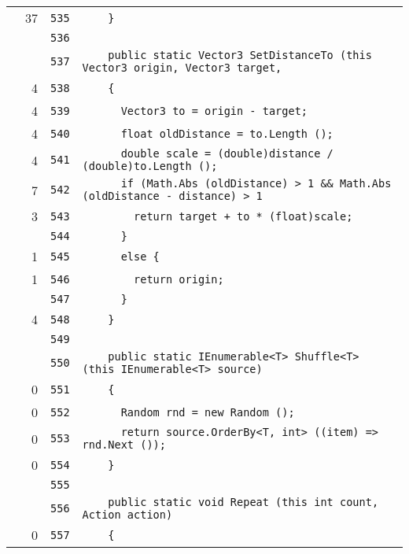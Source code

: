 \documentclass[a4paper,10pt]{article}
\begin{document}
\begin{longtable}[l]{lrrl}
\cellcolor{green} & 37 & \verb~535~ & \verb~    }~\\
\cellcolor{gray} &  & \verb~536~ & \verb~~\\
\cellcolor{gray} &  & \verb~537~ & \verb~    public static Vector3 SetDistanceTo (this Vector3 origin, Vector3 target, ~\\
\cellcolor{green} & 4 & \verb~538~ & \verb~    {~\\
\cellcolor{green} & 4 & \verb~539~ & \verb~      Vector3 to = origin - target;~\\
\cellcolor{green} & 4 & \verb~540~ & \verb~      float oldDistance = to.Length ();~\\
\cellcolor{green} & 4 & \verb~541~ & \verb~      double scale = (double)distance / (double)to.Length ();~\\
\cellcolor{green} & 7 & \verb~542~ & \verb~      if (Math.Abs (oldDistance) > 1 && Math.Abs (oldDistance - distance) > 1 ~\\
\cellcolor{green} & 3 & \verb~543~ & \verb~        return target + to * (float)scale;~\\
\cellcolor{gray} &  & \verb~544~ & \verb~      }~\\
\cellcolor{green} & 1 & \verb~545~ & \verb~      else {~\\
\cellcolor{green} & 1 & \verb~546~ & \verb~        return origin;~\\
\cellcolor{gray} &  & \verb~547~ & \verb~      }~\\
\cellcolor{green} & 4 & \verb~548~ & \verb~    }~\\
\cellcolor{gray} &  & \verb~549~ & \verb~~\\
\cellcolor{gray} &  & \verb~550~ & \verb~    public static IEnumerable<T> Shuffle<T> (this IEnumerable<T> source)~\\
\cellcolor{red} & 0 & \verb~551~ & \verb~    {~\\
\cellcolor{red} & 0 & \verb~552~ & \verb~      Random rnd = new Random ();~\\
\cellcolor{red} & 0 & \verb~553~ & \verb~      return source.OrderBy<T, int> ((item) => rnd.Next ());~\\
\cellcolor{red} & 0 & \verb~554~ & \verb~    }~\\
\cellcolor{gray} &  & \verb~555~ & \verb~~\\
\cellcolor{gray} &  & \verb~556~ & \verb~    public static void Repeat (this int count, Action action)~\\
\cellcolor{red} & 0 & \verb~557~ & \verb~    {~\\

\end{longtable}
\end{document}
